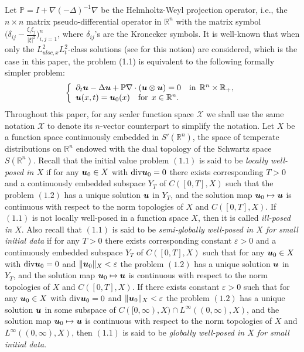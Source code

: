 \documentclass[11pt]{article}
\newcommand{\diva}{{\rm div}}
\newcommand{\bfu}{{\mbox{\boldmath $u$}}}
\begin{document}
  Let $\mathbb{P}=I+\nabla(-\Delta)^{-1}\nabla$ be the Helmholtz-Weyl projection operator, i.e., the $n\times n$ matrix pseudo-differential operator
  in $\mathbb{R}^n$ with the matrix symbol $\Big(\delta_{ij}-\frac{\xi_i\xi_j}{|\xi|^2}\Big)_{i,j=1}^n$, where $\delta_{ij}$'s are the Kronecker symbols.
  It is well-known that when only the $L^2_{uloc,x}L^2_t$-class solutions (see \cite{LEM02} for this notion) are considered, which is the case in this
  paper, the problem (1.1) is equivalent to the following formally simpler problem:
\begin{eqnarray}
\left\{
\begin{array}{l}
  \partial_t\bfu-\Delta\bfu+\mathbb{P}\nabla\cdot(\bfu\otimes\bfu)=0\quad \mbox{in}\;\,\mathbb{R}^n\times\mathbb{R}_+,\\
  \bfu(x,t)=\bfu_0(x)\quad \mbox{for}\;\, x\in\mathbb{R}^n.
\end{array}
\right.
\end{eqnarray}
  Throughout this paper, for any scaler function space $\mathscr{X}$ we shall use the same notation $\mathscr{X}$ to denote its $n$-vector counterpart
  to simplify the notation. Let $X$ be a function space continuously embedded in $S'(\mathbb{R}^n)$, the space of temperate distributions on
  $\mathbb{R}^n$ endowed with the dual topology of the Schwartz space $S(\mathbb{R}^n)$. Recall that the initial value problem $(1.1)$ is said to be
  {\em locally well-posed in $X$} if for any $\bfu_0\in X$ with $\diva\bfu_0=0$ there exists corresponding $T>0$ and a continuously embedded subspace
  $Y_T$ of $C([0,T],X)$ such that the problem $(1.2)$ has a unique solution $\bfu$ in $Y_T$, and the solution map $\bfu_0\mapsto\bfu$ is continuous
  with respect to the norm topologies of $X$ and $C([0,T],X)$. If $(1.1)$ is not locally well-posed in a function space $X$, then it is called {\em
  ill-posed in $X$}. Also recall that $(1.1)$ is said to be {\em semi-globally well-posed in $X$ for small initial data} if for any $T>0$ there exists
  corresponding constant $\varepsilon>0$ and a continuously embedded subspace $Y_T$ of $C([0,T],X)$ such that for any $\bfu_0\in X$ with $\diva\bfu_0=0$
  and $\|\bfu_0\|_X<\varepsilon$ the problem $(1.2)$ has a unique solution $\bfu$ in $Y_T$, and the solution map $\bfu_0\mapsto\bfu$ is continuous with
  respect to the norm topologies of $X$ and $C([0,T],X)$. If there exists constant $\varepsilon>0$ such that for any $\bfu_0\in X$ with $\diva\bfu_0=0$
  and $\|\bfu_0\|_X<\varepsilon$ the problem $(1.2)$ has a unique solution $\bfu$ in some subspace of $C([0,\infty),X)\cap L^{\infty}((0,\infty),X)$,
  and the solution map $\bfu_0\mapsto\bfu$ is continuous with respect to the norm topologies of $X$ and $L^{\infty}((0,\infty),X)$, then $(1.1)$ is
  said to be {\em globally well-posed in $X$ for small initial data}.
\end{document}

